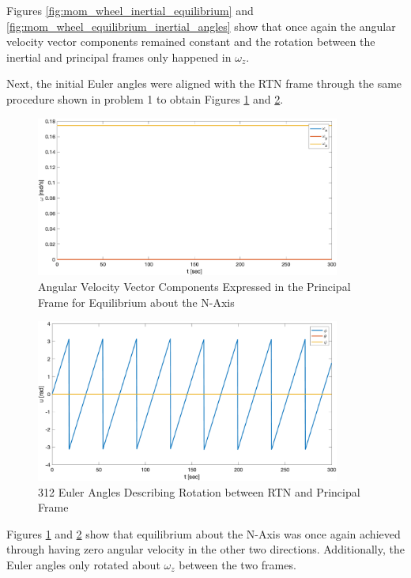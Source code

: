 Figures \ref{fig:mom_wheel_inertial_equilibrium} and \ref{fig:mom_wheel_equilibrium_inertial_angles} show that once again the angular velocity vector components remained constant and the rotation between the inertial and principal frames only happened in $\omega_z$.

Next, the initial Euler angles were aligned with the RTN frame through the same procedure shown in problem 1 to obtain Figures \ref{fig:mom_wheel_RTN_equilibrium} and \ref{fig:mom_wheel_equilibrium_RTN_angles}.

\begin{figure}[H]
    \centering
    \captionsetup{justification = centering}
    \includegraphics[width = 10cm]{Images/PS4/mom_wheel_equilibrium_RTN_velocities.png}
    \caption{Angular Velocity Vector Components Expressed in the Principal Frame for Equilibrium about the N-Axis}
    \label{fig:mom_wheel_RTN_equilibrium}
\end{figure}

\begin{figure}[H]
    \centering
    \captionsetup{justification = centering}
    \includegraphics[width = 10cm]{Images/PS4/mom_wheel_equilibrium_RTN_angles.png}
    \caption{312 Euler Angles Describing Rotation between RTN and Principal Frame}
    \label{fig:mom_wheel_equilibrium_RTN_angles}
\end{figure}

Figures \ref{fig:mom_wheel_RTN_equilibrium} and \ref{fig:mom_wheel_equilibrium_RTN_angles} show that equilibrium about the N-Axis was once again achieved through having zero angular velocity in the other two directions. Additionally, the Euler angles only rotated about $\omega_z$ between the two frames.

